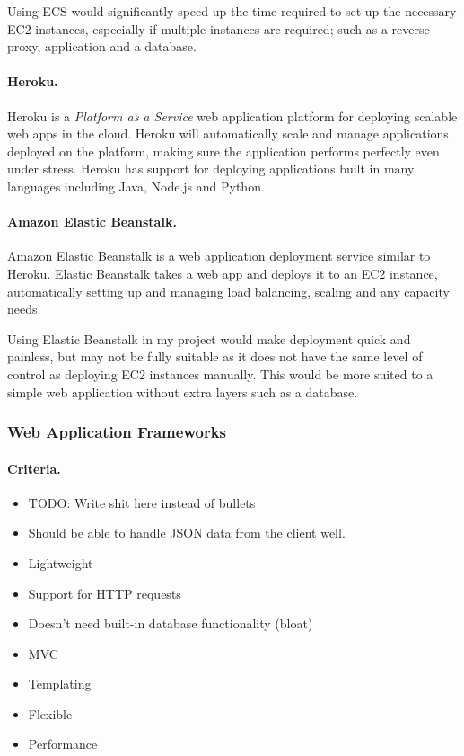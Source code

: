 \documentclass[a4paper, 12pt]{article}
\begin{document}

Using ECS would significantly speed up the time required to set up the necessary EC2 instances, especially if multiple instances are required; such as a reverse proxy, application and a database.

\paragraph{Heroku.}
Heroku is a \emph{Platform as a Service} web application platform for deploying scalable web apps in the cloud. Heroku will automatically scale and manage applications deployed on the platform, making sure the application performs perfectly even under stress. Heroku has support for deploying applications built in many languages including Java, Node.js and Python.


\paragraph{Amazon Elastic Beanstalk.}
Amazon Elastic Beanstalk is a web application deployment service similar to Heroku. Elastic Beanstalk takes a web app and deploys it to an EC2 instance, automatically setting up and managing load balancing, scaling and any capacity needs.


Using Elastic Beanstalk in my project would make deployment quick and painless, but may not be fully suitable as it does not have the same level of control as deploying EC2 instances manually. This would be more suited to a simple web application without extra layers such as a database.


\subsubsection{Web Application Frameworks}
\paragraph{Criteria.}
\begin{itemize}
\item{TODO: Write shit here instead of bullets}
\item{Should be able to handle JSON data from the client well.}
\item{Lightweight}
\item{Support for HTTP requests}
\item{Doesn’t need built-in database functionality (bloat)}
\item{MVC}
\item{Templating}
\item{Flexible}
\item{Performance}
\end{itemize}
\end{document}
